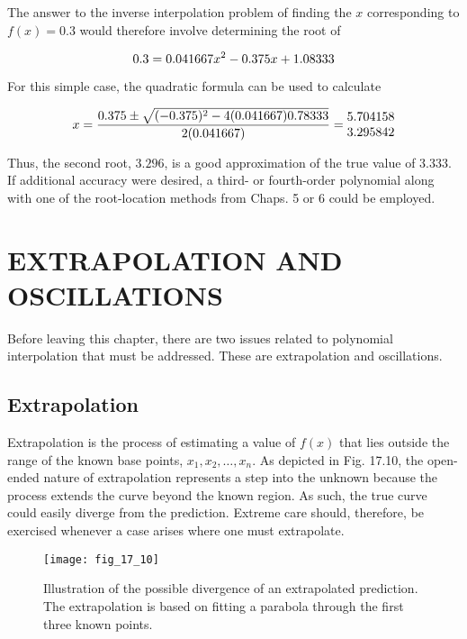 \documentclass[../main.tex]{subfiles}
\begin{document}
\noindent The answer to the inverse interpolation problem of finding the $x$ corresponding to
$f (x) = 0.3$ would therefore involve determining the root of

\begin{equation}
	\notag
	0.3 = 0.041667x^2 - 0.375x + 1.08333
\end{equation}

\noindent For this simple case, the quadratic formula can be used to calculate

\begin{equation}
	\notag
	x = \frac{0.375 \pm \sqrt{(-0.375)^2 - 4(0.041667)0.78333}}{2(0.041667)} = 
	\begin{matrix}
		5.704158 \\ 3.295842
	\end{matrix}
\end{equation}

\noindent Thus, the second root, $3.296$, is a good approximation of the true value of $3.333$. If additional accuracy were desired, a third- or fourth-order polynomial along with one of the
root-location methods from Chaps. 5 or 6 could be employed.

\label{cha:cha_P_17_5} %
\section{EXTRAPOLATION AND OSCILLATIONS}

\noindent Before leaving this chapter, there are two issues related to polynomial interpolation that
must be addressed. These are extrapolation and oscillations.

\label{cha:cha_P_17_5_1} 
\subsection{Extrapolation}

\noindent Extrapolation is the process of estimating a value of $f (x)$ that lies outside the range of the
known base points, $x_1 , x_2, \dots , x_n$. As depicted in Fig. 17.10, the open-ended nature of extrapolation represents a step into the unknown because the process extends the curve
beyond the known region. As such, the true curve could easily diverge from the prediction.
Extreme care should, therefore, be exercised whenever a case arises where one must
extrapolate.

\begin{figure}[H] 
	\centering
	\texttt{[image: fig\_17\_10]}
	\caption{\textsf{Illustration of the possible divergence of an extrapolated prediction. The extrapolation is based
	on fitting a parabola through the first three known points.}}
	\label{fig:fig_17_10}
\end{figure}
\end{document}

